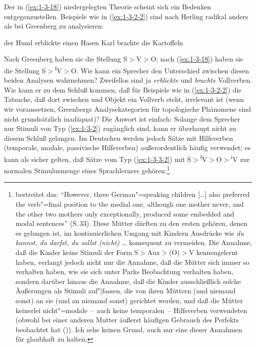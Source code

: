 \documentclass[output=paper]{langsci/langscibook}
\begin{document}
\ssubsubsection{}%
\label{subsubsec:1-3.1.3}

Der in (\ref{ex:1-3-18}) niedergelegten Theorie scheint sich ein
Bedenken entgegenzustellen. Beispiele wie in (\ref{ex:1-3-2-2}) sind
nach Herling radikal anders als bei Greenberg zu analysieren:
\begin{exe}
\makeatletter{}\label{ex:1-3-2-2}\makeatother
\begin{xlist}
\ex\label{ex:1-3-2a-2} der Hund erblickte einen Hasen
\ex\label{ex:1-3-2b-2} Karl brachte die Kartoffeln
\end{xlist}
\end{exe}
Nach Greenberg haben sie die Stellung S$>$V$>$O; nach (\ref{ex:1-3-18}) haben sie die Stellung
S$>$\textsuperscript{f}V$>$O. Wie kann ein Sprecher den Unterschied zwischen diesen beiden Analysen
wahrnehmen? Zweifellos sind ja \textit{erblickte} und \textit{brachte} Vollverben. Wie kann er zu
dem Schluß kommen, daß für Beispiele wie in (\ref{ex:1-3-2-2}) die Tatsache, daß dort zwischen
 und Objekt ein Vollverb steht, irrelevant ist (wenn wir voraussetzen, Greenbergs Analysekategorien für topologische Phänomene sind nicht grundsätzlich inadäquat)? Die Anwort ist einfach: Solange dem Sprecher nur Stimuli von Typ (\ref{ex:1-3-2}) zugänglich sind, kann er überhaupt nicht zu diesem Schluß gelangen. Im Deutschen
werden jedoch Sätze mit Hilfsverben (temporale, modale, passivische Hilfsverben)
außerordentlich häufig verwendet; es kann als sicher gelten, daß Sätze vom Typ (\ref{ex:1-3-3-2})
mit S$>$\textsuperscript{f}V$>$O$>$\textsuperscript{i}V zur normalen Stimulusmenge eines
Sprachlerners gehören:\footnote{%
  \citet{Park1981} bestreitet das: "`However, three German"=speaking children [\ldots] also preferred
  the verb"=final position to the medial one, although one mother never, and the other two mothers
  only exceptionally, produced some embedded and modal sentences"' (S.\,33). Diese Mütter dürften zu
  den ersten gehören, denen es gelungen ist, im kontinuierlichen Umgang mit Kindern Ausdrücke wie
  \emph{du kannst, du darfst, du sollst (nicht) \ldots} konsequent zu vermeiden. Die Annahme, daß
  die Kinder keine Stimuli der Form S$>$Aux$>$(O)$>$V kennengelernt haben, verlangt jedoch nicht nur
  die Annahme, daß die Mütter sich immer so verhalten haben, wie sie sich unter Parks Beobachtung
  verhalten haben, sondern darüber hinaus die Annahme, daß die Kinder ausschließlich solche
  Äußerungen als Stimuli auf"|fassen, die von ihren Müttern (und niemand sonst) an sie (und an
  niemand sonst) gerichtet werden, und daß die Mütter keinerlei nicht"=modale~-- auch keine
  temporalen~-- Hilfsverben verwendeten (obwohl \citeauthor{Park1981} bei einer anderen Mutter
  äußerst häufigen Gebrauch des Perfekts beobachtet hat (\citeyear[86]{Park1981})). Ich sehe keinen
  Grund, auch nur eine dieser Annahmen für glaubhaft zu halten.%
}
\end{document}
